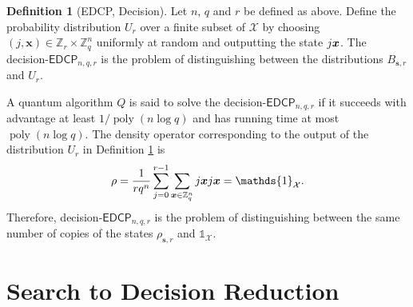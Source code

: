 \documentclass[11pt]{article}
\theoremstyle{plain}
\theoremstyle{definition}
\newtheorem{definition}[theorem]{Definition}
\DeclareMathOperator{\poly}{poly}
\let\ket\relax
\DeclarePairedDelimiter{\ket}{\lvert}{\rangle}
\let\bra\relax
\DeclarePairedDelimiter{\bra}{\langle}{\rvert}
\def\Z{\mathbb{Z}}
\def\edcp{\mathsf{EDCP}}
\begin{document}
\begin{definition}[EDCP, Decision]
    \label{def:d-edcp}
    Let $n$, $q$ and $r$ be defined as above. Define the probability distribution $U_{r}$ over a finite subset of $\mathcal{X}$ by choosing $(j, \bm{x}) \in \Z_r \times \Z_q^n$ uniformly at random and outputting the state $\ket{j}\ket{\bm{x}}$. The decision-$\edcp_{n, q, r}$ is the problem of distinguishing between the distributions $B_{\bm{s}, r}$ and $U_r$.
\end{definition}
A quantum algorithm $Q$ is said to solve the decision-$\edcp_{n, q, r}$ if it succeeds with advantage at least $1 / \poly(n\log q)$ and has running time at most $\poly(n\log q)$. The density operator corresponding to the output of the distribution $U_r$ in Definition \ref{def:d-edcp} is
\[ \rho = \frac{1}{rq^n} \sum_{j = 0}^{r - 1} \sum_{\bm{x} \in \Z_q^n}  \ket{j}\ket{\bm{x}} \bra{j}\bra{\bm{x}} = \mathds{1}_{\mathcal{X}}. \]
Therefore, decision-$\edcp_{n, q, r}$ is the problem of distinguishing between the same number of copies of the states $\rho_{\bm{s}, r}$ and $\mathds{1}_{\mathcal{X}}$. 





\section{Search to Decision Reduction}
\end{document}
